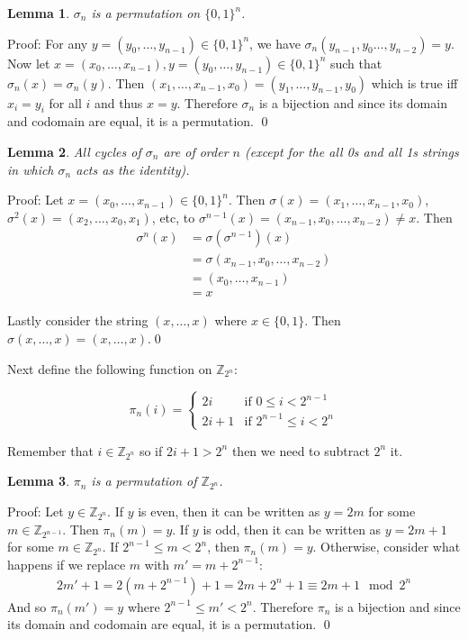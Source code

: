 \documentclass[10pt]{article}
\newtheorem{lemma}{Lemma}
\begin{document}
\begin{lemma}
    $\sigma_n$ is a permutation on $\{0,1\}^n$. 
\end{lemma}

\noindent Proof: For any $y = (y_0,\dots, y_{n-1}) \in \{0,1\}^n$, we have $\sigma_n(y_{n-1},y_0\dots, y_{n-2}) = y$. Now let $x =(x_0,\dots, x_{n-1}), y =(y_0,\dots, y_{n-1})\in \{0,1\}^n$ such that \\$\sigma_n(x) = \sigma_n(y)$. Then $(x_1,\dots, x_{n-1}, x_0) = (y_1,\dots, y_{n-1}, y_0)$ which is true iff $x_i = y_i$ for all $i$ and thus $x = y$. Therefore $\sigma_n$ is a bijection and since its domain and codomain are equal, it is a permutation. \qed

\begin{lemma}
All cycles of $\sigma_n$ are of order $n$ (except for the all 0s and all 1s strings in which $\sigma_n$ acts as the identity).
\end{lemma}
\noindent Proof: Let $x = (x_0, \dots, x_{n-1}) \in \{0,1\}^n$. Then $\sigma(x) = (x_1, \dots, x_{n-1}, x_0)$, $\sigma^2(x) = (x_2, \dots, x_0, x_1)$, etc, to $\sigma^{n-1}(x) = (x_{n-1}, x_0, \dots, x_{n-2}) \neq x$. Then
\begin{align*}
    \sigma^n(x) &= \sigma(\sigma^{n-1})(x) \\
    &= \sigma(x_{n-1}, x_0, \dots, x_{n-2}) \\
    &= (x_0, \dots, x_{n-1}) \\
    &=  x
\end{align*}

Lastly consider the string $(x, \dots, x)$ where $x \in \{0,1\}$. Then \\$\sigma(x, \dots, x) = (x, \dots, x)$.\qed

Next define the following function on $\mathbb{Z}_{2^n}$:

\begin{equation}
    \pi_n(i) = \begin{cases}
        2i &\text{if $0 \leq i < 2^{n-1}$} \\
        2i + 1 &\text{if $2^{n-1} \leq i < 2^n$}
    \end{cases}
\end{equation}

Remember that $i \in \mathbb{Z}_{2^n}$ so if $2i + 1 > 2^n$ then we need to subtract $2^n$ it.

\begin{lemma}
    $\pi_n$ is a permutation of $\mathbb{Z}_{2^n}$.
\end{lemma}
\noindent Proof: Let $y \in \mathbb{Z}_{2^n}$. If $y$ is even, then it can be written as $y = 2m$ for some $m \in \mathbb{Z}_{2^{n-1}}$. Then $\pi_n(m) = y$. If $y$ is odd, then it can be written as $y = 2m + 1$ for some $m \in \mathbb{Z}_{2^n}$. If $2^{n-1} \leq m < 2^n$, then $\pi_n(m) = y$. Otherwise, consider what happens if we replace $m$ with $m' = m + 2^{n-1}$:
\begin{align*}
    2m' + 1 = 2(m + 2^{n-1}) + 1 = 2m + 2^n + 1 \equiv 2m + 1 \mod 2^n
\end{align*}
And so $\pi_n(m') = y$ where $2^{n-1} \leq m' < 2^n$. Therefore $\pi_n$ is a bijection and since its domain and codomain are equal, it is a permutation. \qed
\end{document}

